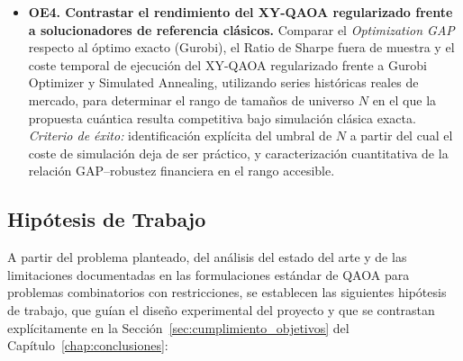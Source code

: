 \begin{itemize}
    \item \textbf{OE4. Contrastar el rendimiento del XY-QAOA regularizado
    frente a solucionadores de referencia clásicos.}
    Comparar el \textit{Optimization GAP} respecto al óptimo exacto
    (Gurobi), el Ratio de Sharpe fuera de muestra y el coste temporal de
    ejecución del XY-QAOA regularizado frente a Gurobi Optimizer y Simulated
    Annealing, utilizando series históricas reales de mercado, para
    determinar el rango de tamaños de universo $N$ en el que la propuesta
    cuántica resulta competitiva bajo simulación clásica exacta.
    \textit{Criterio de éxito:} identificación explícita del umbral de $N$ a
    partir del cual el coste de simulación deja de ser práctico, y
    caracterización cuantitativa de la relación GAP–robustez financiera en
    el rango accesible.

\end{itemize}

\subsection{Hipótesis de Trabajo}
\label{sec:hipotesis}

A partir del problema planteado, del análisis del estado del arte y de las limitaciones
documentadas en las formulaciones estándar de QAOA para problemas combinatorios con
restricciones, se establecen las siguientes hipótesis de trabajo, que guían el diseño
experimental del proyecto y que se contrastan explícitamente en la
Sección~\ref{sec:cumplimiento_objetivos} del Capítulo~\ref{chap:conclusiones}:

